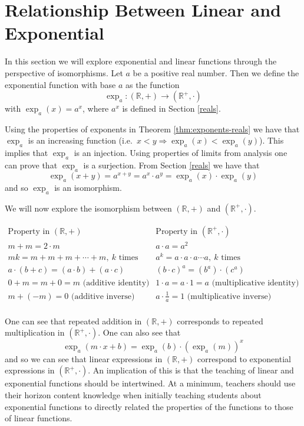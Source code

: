 \documentclass[
]{book}
\theoremstyle{definition}
\theoremstyle{definition}
\theoremstyle{definition}
\theoremstyle{definition}
\theoremstyle{remark}
\begin{document}
\hypertarget{linear-exponential}{%
\section{Relationship Between Linear and Exponential}\label{linear-exponential}}

In this section we will explore exponential and linear functions through the perspective of isomorphisms. Let \(a\) be a positive real number. Then we define the exponential function with base \(a\) as the function \[\exp_a: (\mathbb{R},+) \rightarrow (\mathbb{R}^+,\cdot)\] with \(\exp_a{(x)}= a^x\), where \(a^x\) is defined in Section \ref{reals}.

Using the properties of exponents in Theorem \ref{thm:exponents-reals} we have that \(\exp_a\) is an increasing function (i.e.~\(x<y \Rightarrow \exp_a{(x)}<\exp_a{(y)}\)). This implies that \(\exp_a\) is an injection. Using properties of limits from analysis one can prove that \(\exp_a\) is a surjection. From Section \ref{reals} we have that \[\exp_a{(x+y)} = a^{x+y} = a^x \cdot a^y = \exp_a{(x)}\cdot \exp_a{(y)}\] and so \(\exp_a\) is an isomorphism.

We will now explore the isomorphism between \((\mathbb{R},+)\) and \((\mathbb{R}^+,\cdot)\).

\[\begin{array}{c|c}
\mbox{Property in } (\mathbb{R},+) & \mbox{Property in } (\mathbb{R}^+,\cdot) \\ \hline
 m+m=2\cdot m & a\cdot a = a^2 \\ 
mk=m+m+m+\cdots +m, \: k \mbox{ times} & a^k=a \cdot a \cdot a\cdots a, \: k \mbox{ times} \\ 
a\cdot (b+c) = (a\cdot b) + (a\cdot c) & (b\cdot c)^a = (b^a) \cdot (c^a) \\ 
0+m=m+0=m  \mbox{ (additive identity)} & 1\cdot a=a\cdot 1= a  \mbox{ (multiplicative identity)} \\ 
m+(-m)=0 \mbox{ (additive inverse)} & a\cdot \frac{1}{a}=1 \mbox{ (multiplicative inverse)} \\ 
\end{array}\]

One can see that repeated addition in \((\mathbb{R},+)\) corresponds to repeated multiplication in \((\mathbb{R}^+,\cdot)\). One can also see that \[\exp_a\left( m\cdot x + b\right) = \exp_a(b) \cdot \left(\exp_a(m)\right)^x\] and so we can see that linear expressions in \((\mathbb{R},+)\) correspond to exponential expressions in \((\mathbb{R}^+,\cdot)\). An implication of this is that the teaching of linear and exponential functions should be intertwined. At a minimum, teachers should use their horizon content knowledge when initially teaching students about exponential functions to directly related the properties of the functions to those of linear functions.
\end{document}
